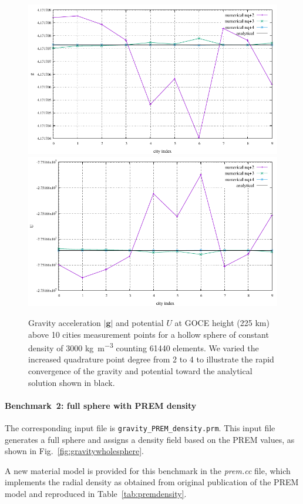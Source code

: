  \begin{figure}[h!]
\centering
\includegraphics[width=0.48\linewidth]{../../benchmarks/gravity_prem/doc/cities_gravity_const_g.pdf}
\includegraphics[width=0.48\linewidth]{../../benchmarks/gravity_prem/doc/cities_gravity_const_U.pdf}
\caption{Gravity acceleration $|{\mathbf g}|$ and potential $U$ at GOCE height  (225 \si{km}) above 10 cities measurement points for a hollow sphere of constant density of 3000 \si{\kilogram\per\cubic\metre} counting 61440 elements. We varied the increased quadrature point degree from 2 to 4 to illustrate the rapid convergence of the gravity and potential toward the analytical solution shown in black.}
\label{fig:gravitycities}
\end{figure}

\paragraph{Benchmark~2: full sphere with PREM density}
\hfill \break
The corresponding input file is \texttt{gravity\_PREM\_density.prm}.
This input file generates a full sphere and assigns a density field based on the PREM values, as shown in Fig.~\ref{fig:gravitywholesphere}.

A new material model is provided for this benchmark in the {\sl prem.cc} file, which implements the radial density as obtained from original publication of the PREM model \cite{dzan81} and reproduced in Table~\ref{tab:premdensity}.

